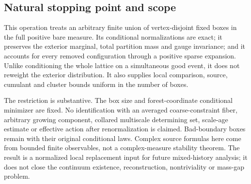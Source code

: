 \documentclass[11pt]{article}
\theoremstyle{remark}
\begin{document}
\subsection{Natural stopping point and scope}
\label{nbr-scope}

This operation treats an arbitrary finite union of vertex-disjoint
fixed boxes in the full positive bare measure. Its conditional
normalizations are exact; it preserves the exterior marginal, total
partition mass and gauge invariance; and it accounts for every removed
configuration through a positive sparse expansion. Unlike conditioning
the whole lattice on a simultaneous good event, it does not reweight
the exterior distribution. It also supplies local comparison, source,
cumulant and cluster bounds uniform in the number of boxes.

The restriction is substantive. The box size and forest-coordinate
conditional minimizer are fixed. No identification with an averaged
coarse-constraint fiber, arbitrary growing component, collared
multiscale determining set, scale-age estimate or effective action
after renormalization is claimed. Bad-boundary boxes remain with their
original conditional laws. Complex source formulas here come from
bounded finite observables, not a complex-measure stability theorem.
The result is a normalized local replacement input for future
mixed-history analysis; it does not close the continuum existence,
reconstruction, nontriviality or mass-gap problem.
\end{document}
